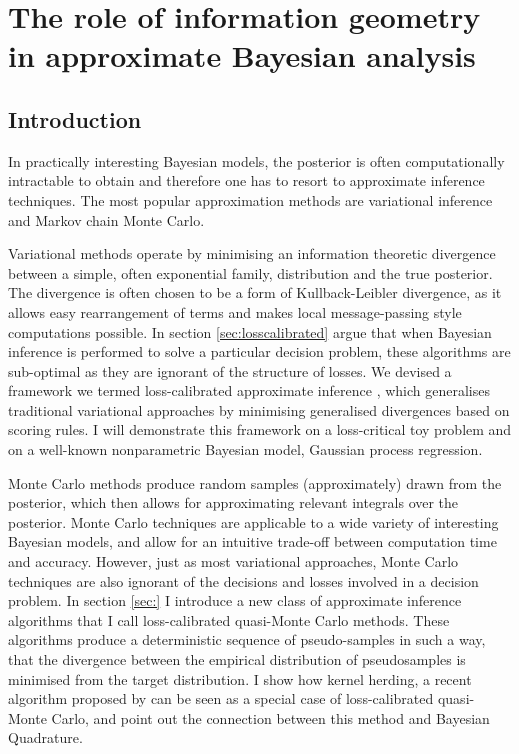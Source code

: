 \chapter[approximate inference]{The role of information geometry in approximate Bayesian analysis}

\section{Introduction}

In practically interesting Bayesian models, the posterior is often computationally intractable to obtain and therefore one has to resort to approximate inference techniques. The most popular approximation methods are variational inference and Markov chain Monte Carlo.

Variational methods operate by minimising an information theoretic divergence between a simple, often exponential family, distribution and the true posterior. The divergence is often chosen to be a form of Kullback-Leibler divergence, as it allows easy rearrangement of terms and makes local message-passing style computations possible. In section \ref{sec:losscalibrated} argue that when Bayesian inference is performed to solve a particular decision problem, these algorithms are sub-optimal as they are ignorant of the structure of losses. We devised a framework we termed loss-calibrated approximate inference \cite{}, which generalises traditional variational approaches by minimising generalised divergences based on scoring rules. I will demonstrate this framework on a loss-critical toy problem and on a well-known nonparametric Bayesian model, Gaussian process regression.

Monte Carlo methods produce random samples (approximately) drawn from the posterior, which then allows for approximating relevant integrals over the posterior. Monte Carlo techniques are applicable to a wide variety of interesting Bayesian models, and allow for an intuitive trade-off between computation time and accuracy. However, just as most variational approaches, Monte Carlo techniques are also ignorant of the decisions and losses involved in a decision problem. In section \ref{sec:} I introduce a new class of approximate inference algorithms that I call loss-calibrated quasi-Monte Carlo methods. These algorithms produce a deterministic sequence of pseudo-samples in such a way, that the divergence between the empirical distribution of pseudosamples is minimised from the target distribution. I show how kernel herding, a recent algorithm proposed by \cite{kernelherding} can be seen as a special case of loss-calibrated quasi-Monte Carlo, and point out the connection between this method and Bayesian Quadrature.

